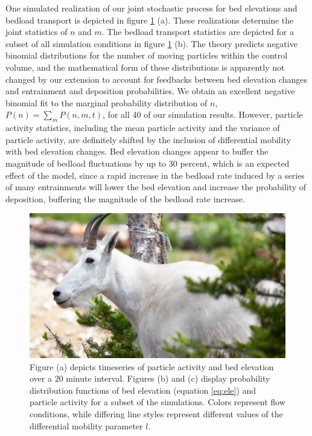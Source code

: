 \documentclass[draft]{agujournal2018}
\begin{document}
One simulated realization of our joint stochastic process for bed elevations and bedload transport is depicted in figure \ref{fig:pdfs} (a). 
These realizations determine the joint statistics of $n$ and $m$. 
The bedload transport statistics are depicted for a subset of all simulation conditions in figure \ref{fig:pdfs} (b). 
The \citet{Ancey2008} theory predicts negative binomial distributions for the number of moving particles within the control volume, and the mathematical form of these distributions is apparently not changed by our extension to account for feedbacks between bed elevation changes and entrainment and deposition probabilities.
We obtain an excellent negative binomial fit to the marginal probability distribution of $n$, $P(n) = \sum_m P(n,m,t)$, for all 40 of our simulation results.
However, particle activity statistics, including the mean particle activity and the variance of particle activity, are definitely shifted by the inclusion of differential mobility with bed elevation changes.
Bed elevation changes appear to buffer the magnitude of bedload fluctuations by up to 30 percent, which is an expected effect of the model, since a rapid increase in the bedload rate induced by a series of many entrainments will lower the bed elevation and increase the probability of deposition, buffering the magnitude of the bedload rate increase.

\begin{figure}[t!]
  \includegraphics[width=\linewidth,keepaspectratio]{rectdummy}
  \caption{Figure (a) depicts timeseries of particle activity and bed elevation over a $20$ minute interval. Figures (b) and (c) display probability distribution functions of bed elevation (equation \ref{eq:ele}) and particle activity for a subset of the simulations. Colors represent flow conditions, while differing line styles represent different values of the differential mobility parameter $l$.}
\vspace{-1.0cm}
  \label{fig:pdfs}
\end{figure}
\end{document}
